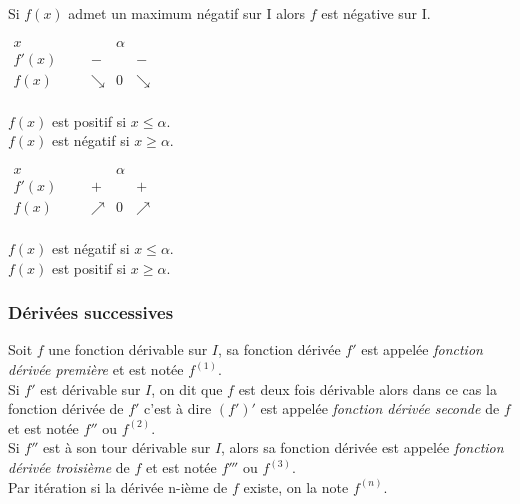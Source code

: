 Si  $f(x)$ admet un maximum négatif 
sur  I  alors $ f$  est  négative sur  I.

$\begin{array}{c|ccccccc}
x &        &        &        & \alpha &        &        &        \\
\hline
f'(x) &     &        & -      &        &   -     &        &        \\
\hline
f(x)  &     &        & \searrow & 0      & \searrow &        &        \\
\end{array}
$

$f(x)$  est positif si $x \leq \alpha$. \\
$f(x)$  est négatif si $x \geq \alpha$.

$\begin{array}{c|ccccccc}
x &        &        &        & \alpha &        &        &        \\
\hline
f'(x) &     &        & +      &        & +      &        &        \\
\hline
f(x)  &     &        & \nearrow & 0      & \nearrow &        &        \\
\end{array}
$

$f(x)$  est négatif si $x \leq \alpha$. \\
$f(x)$  est positif si  $ x \geq\alpha$.




 \subsubsection*{Dérivées successives}

 \begin{definition}
 Soit $ f $ une fonction dérivable sur $ I $, sa fonction  dérivée $ f' $ est appelée                            
  \emph{fonction dérivée première} et est notée $ f^{(1)}.$ \\
 Si $ f'$ est dérivable sur $ I $, on dit que $ f $ est deux fois dérivable alors dans ce cas la fonction  dérivée  de $ f' $ c'est à dire $ (f')' $ est  appelée \emph{fonction dérivée seconde} de $ f $ et est notée $ f'' $ ou $ f^{(2)} .$ \\ 
  Si $ f''$  est à son tour  dérivable sur $ I $, alors sa fonction  dérivée   est  appelée \emph{fonction dérivée troisième} de $ f $ et est notée $ f''' $ ou $ f^{(3)} .$ \\ 
 Par itération si la dérivée n-ième de $ f $ existe, on la note $ f^{(n)} .$   
 \end{definition}
 
